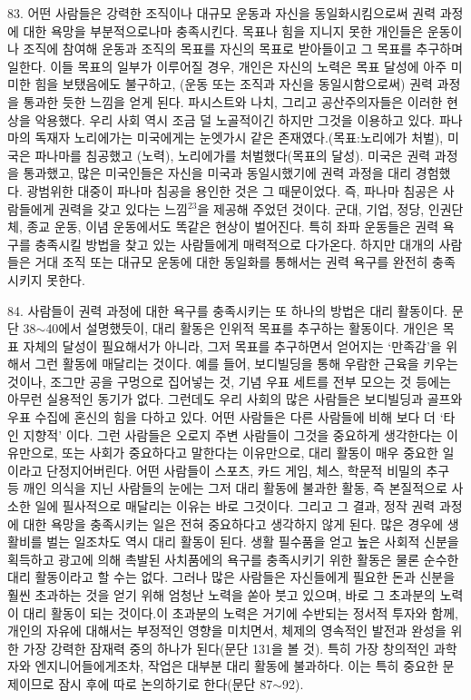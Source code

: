\documentclass[11pt,a4paper]{article}
\begin{document}
\begin{multicols}{2}
83. 어떤 사람들은 강력한 조직이나 대규모 운동과 자신을 동일화시킴으로써 권력 과정에 대한 욕망을  부분적으로나마 충족시킨다. 목표나 힘을 지니지 못한 개인들은 운동이나 조직에 참여해 운동과 조직의  목표를 자신의 목표로 받아들이고 그 목표를 추구하며 일한다. 이들 목표의 일부가 이루어질 경우, 개인은 자신의 노력은 목표 달성에 아주 미미한 힘을 보탰음에도 불구하고, (운동 또는 조직과 자신을  동일시함으로써) 권력 과정을 통과한 듯한 느낌을 얻게 된다. 파시스트와 나치, 그리고 공산주의자들은  이러한 현상을 악용했다. 우리 사회 역시 조금 덜 노골적이긴 하지만 그것을 이용하고 있다. 파나마의  독재자 노리에가는 미국에게는 눈엣가시 같은 존재였다.(목표:노리에가 처벌), 미국은 파나마를 침공했고 (노력), 노리에가를 처벌했다(목표의 달성). 미국은 권력 과정을 통과했고, 많은 미국인들은 자신을  미국과 동일시했기에 권력 과정을 대리 경험했다. 광범위한 대중이 파나마 침공을 용인한 것은 그  때문이었다. 즉, 파나마 침공은 사람들에게 권력을 갖고 있다는 느낌\hyperlink{23}{$^{23}$}을 제공해 주었던 것이다. 군대,  기업, 정당, 인권단체, 종교 운동, 이념 운동에서도 똑같은 현상이 벌어진다. 특히 좌파 운동들은 권력  욕구를 충족시킬 방법을 찾고 있는 사람들에게 매력적으로 다가온다. 하지만 대개의 사람들은 거대 조직 또는 대규모 운동에 대한 동일화를 통해서는 권력 욕구를 완전히 충족시키지 못한다. 


84. 사람들이 권력 과정에 대한 욕구를 충족시키는 또 하나의 방법은 대리 활동이다. 문단 38${\sim}$40에서  설명했듯이, 대리 활동은 인위적 목표를 추구하는 활동이다. 개인은 목표 자체의 달성이 필요해서가  아니라, 그저 목표를 추구하면서 얻어지는 `만족감'을 위해서 그런 활동에 매달리는 것이다. 예를 들어,  보디빌딩을 통해 우람한 근육을 키우는 것이나, 조그만 공을 구멍으로 집어넣는 것, 기념 우표 세트를  전부 모으는 것 등에는 아무런 실용적인 동기가 없다. 그런데도 우리 사회의 많은 사람들은 보디빌딩과  골프와 우표 수집에 혼신의 힘을 다하고 있다. 어떤 사람들은 다른 사람들에 비해 보다 더 `타인 지향적' 이다. 그런 사람들은 오로지 주변 사람들이 그것을 중요하게 생각한다는 이유만으로, 또는 사회가  중요하다고 말한다는 이유만으로, 대리 활동이 매우 중요한 일이라고 단정지어버린다. 어떤 사람들이  스포츠, 카드 게임, 체스, 학문적 비밀의 추구 등 깨인 의식을 지닌 사람들의 눈에는 그저 대리 활동에  불과한 활동, 즉 본질적으로 사소한 일에 필사적으로 매달리는 이유는 바로 그것이다. 그리고 그 결과,  정작 권력 과정에 대한 욕망을 충족시키는 일은 전혀 중요하다고 생각하지 않게 된다. 많은 경우에  생활비를 벌는 일조차도 역시 대리 활동이 된다. 생활 필수품을 얻고 높은 사회적 신분을 획득하고 광고에 의해 촉발된 사치품에의 욕구를 충족시키기 위한 활동은 물론 순수한 대리 활동이라고 할 수는 없다.  그러나 많은 사람들은 자신들에게 필요한 돈과 신분을 훨씬 초과하는 것을 얻기 위해 엄청난 노력을 쏟아  붓고 있으며, 바로 그 초과분의 노력이 대리 활동이 되는 것이다.이 초과분의 노력은 거기에 수반되는  정서적 투자와 함께, 개인의 자유에 대해서는 부정적인 영향을 미치면서, 체제의 영속적인 발전과 완성을  위한 가장 강력한 잠재력 중의 하나가 된다(문단 131을 볼 것). 특히 가장 창의적인 과학자와  엔지니어들에게조차, 작업은 대부분 대리 활동에 불과하다. 이는 특히 중요한 문제이므로 잠시 후에 따로  논의하기로 한다(문단 87${\sim}$92).  



\end{multicols}
\end{document}
